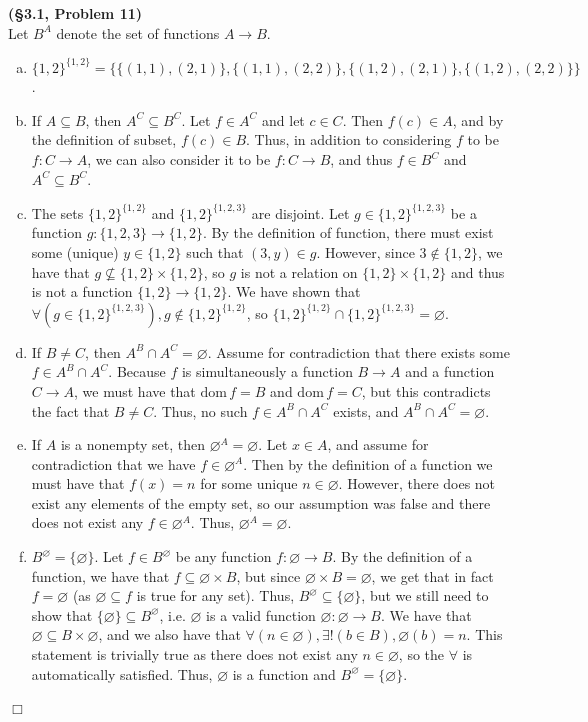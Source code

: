 \documentclass[12pt]{article}
\theoremstyle{definition}
\newenvironment{Solution}{\noindent {\sc Solution.}}{$\Box$ \vspace{2 ex}}
\newcommand{\dom}{\mathrm{dom}}
\begin{document}
\begin{Solution}
{\bf (\S3.1, Problem 11)}\\
Let $B^A$ denote the set of functions $A\to B$.
\begin{enumerate}[(a)]
    \item $\{1,2\}^{\{1,2\}} = \{\{(1,1),(2,1)\}, \{(1,1),(2,2)\},\{(1,2),(2,1)\},\{(1,2),(2,2)\}\}$.
    \item If $A \subseteq B$, then $A^C \subseteq B^C$. Let $f \in A^C$ and let $c \in C$. Then $f(c) \in A$, and by the definition of subset, $f(c) \in B$. Thus, in addition to considering $f$ to be $f : C \to A$, we can also consider it to be $f : C \to B$, and thus $f \in B^C$ and $A^C \subseteq B^C$.
    \item The sets $\{1,2\}^{\{1,2\}}$ and $\{1,2\}^{\{1,2,3\}}$ are disjoint. Let $g \in \{1,2\}^{\{1,2,3\}}$ be a function $g : \{1,2,3\}\to\{1,2\}$. By the definition of function, there must exist some (unique) $y\in \{1,2\}$ such that $(3,y)\in g$. However, since $3\not\in \{1,2\}$, we have that $g \not\subseteq \{1,2\}\times\{1,2\}$, so $g$ is not a relation on $\{1,2\}\times\{1,2\}$ and thus is not a function $\{1,2\}\to\{1,2\}$. We have shown that $\forall(g\in \{1,2\}^{\{1,2,3\}}),g\not\in \{1,2\}^{\{1,2\}}$, so $\{1,2\}^{\{1,2\}} \cap \{1,2\}^{\{1,2,3\}}=\varnothing$.
    \item If $B \ne C$, then $A^B \cap A^C = \varnothing$. Assume for contradiction that there exists some $f \in A^B \cap A^C$. Because $f$ is simultaneously a function $B \to A$ and a function $C \to A$, we must have that $\dom\,f = B$ and $\dom\,f = C$, but this contradicts the fact that $B \ne C$. Thus, no such $f \in A^B \cap A^C$ exists, and $A^B \cap A^C = \varnothing$.
    \item If $A$ is a nonempty set, then $\varnothing^A = \varnothing$. Let $x\in A$, and assume for contradiction that we have $f \in \varnothing^A$. Then by the definition of a function we must have that $f(x)=n$ for some unique $n \in \varnothing$. However, there does not exist any elements of the empty set, so our assumption was false and there does not exist any $f \in \varnothing^A$. Thus, $\varnothing^A = \varnothing$.
    \item $B^\varnothing = \{\varnothing\}$. Let $f \in B^\varnothing$ be any function $f : \varnothing \to B$. By the definition of a function, we have that $f \subseteq \varnothing \times B$, but since $\varnothing \times B = \varnothing$, we get that in fact $f = \varnothing$ (as $\varnothing \subseteq f$ is true for any set). Thus, $B^\varnothing \subseteq \{\varnothing\}$, but we still need to show that $\{\varnothing\} \subseteq B^\varnothing$, i.e. $\varnothing$ is a valid function $\varnothing : \varnothing \to B$. We have that $\varnothing \subseteq B\times \varnothing$, and we also have that $\forall (n\in \varnothing),\exists!(b\in B), \varnothing(b)=n$. This statement is trivially true as there does not exist any $n\in \varnothing$, so the $\forall$ is automatically satisfied. Thus, $\varnothing$ is a function and $B^\varnothing = \{\varnothing\}$.
\end{enumerate}
\end{Solution}
\end{document}
